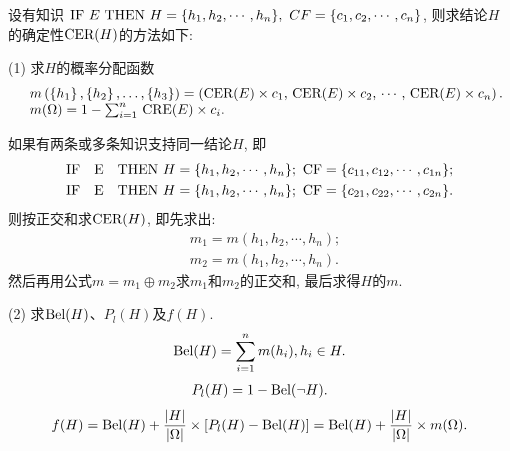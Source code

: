 设有知识 $\textup{IF}\,\, E \,\, \textup{THEN} \,\, H=\{h_1, h_2, \cdots , h_n\}, \,\, CF=\{c_1, c_2, \cdots, c_n\}$,
则求结论$H$的确定性$\textup{CER}(H)$的方法如下:

(1) 求$H$的概率分配函数
\begin{align}
    \begin{array}{ll}
        &m\left(\left\{h_{1}\right\},\left\{h_{2}\right\}, \ldots,\left\{h_{3}\right\} \right)
           =\left( \textup{CER}(E) \times c_{1},\, \textup{CER}(E) \times c_{2},\, \cdots,\, \textup{CER}(E) \times c_{n}\right).\\
        &m(\Omega)=1-\sum_{i=1}^{n} \,\textup{CRE}(E) \times c_{i}.
    \end{array}
\end{align}

\begin{example}
如果有两条或多条知识支持同一结论$H$, 即
 \begin{align}
    &\textup{IF \,\,  E \,\,  THEN}   \,\, H=\{h_1, h_2, \cdots , h_n\};\,\,  \textup{CF}=\{c_{11}, c_{12}, \cdots , c_{1n}\};\\
    &\textup{IF \,\,  E \,\,  THEN}  \,\,  H=\{h_1, h_2, \cdots , h_n\};\,\,  \textup{CF}=\{c_{21}, c_{22}, \cdots , c_{2n}\}.
\end{align}
则按正交和求$\textup{CER}(H)$, 即先求出:
\begin{align*}
    &m_1=m({h_1},{h_2},\cdots,{h_n});\\
    &m_2=m({h_1},{h_2},\cdots,{h_n}).
\end{align*}
然后再用公式$m=m_{1} \oplus m_{2}$求$m_1$和$m_2$的正交和, 最后求得$H$的$m$.
\end{example}

(2) 求$\textup{Bel}(H)$、$P_l(H)$及$f(H)$.
\begin{align*}
    \textup{Bel}(H)=\sum_{i=1}^{n} m(h_i), h_i\in H.
\end{align*}
\begin{align*}
    P_l(H)=1-\textup{Bel}(\neg H).
\end{align*}
\begin{align*}
    f(H)=\textup{Bel}(H)+\frac{|H|}{|\Omega|} \times [P_l(H)-\textup{Bel}(H)] = \textup{Bel}(H)+\frac{|H|}{|\Omega|} \times m(\Omega).
\end{align*}

